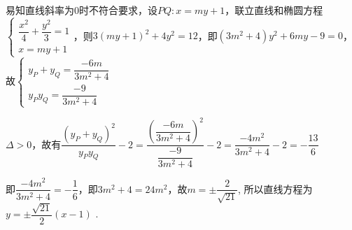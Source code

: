 \begin{enumerate}
\begin{jieda}
\begin{enumerate}
            易知直线斜率为0时不符合要求，设$PQ: x = my + 1$，联立直线和椭圆方程$\left\{\begin{array}{l}
                    \dfrac{{x}^{2}}{4} + \dfrac{{y}^{2}}{3} = 1  \\
                    x = my + 1
            \end{array}\right.$，则$3(my + 1)^2 + 4y^2 = 12$，即$(3m^2+4)y^2+6my-9=0$，故$\left\{\begin{array}{l}
                    y_P+y_Q = \dfrac{-6m}{3m^2+4} \\
                    y_Py_Q = \dfrac{-9}{3m^2+4}
            \end{array}\right.$

            $\Delta > 0$，故有$\dfrac{(y_P+y_Q)^2}{y_Py_Q} - 2 = \dfrac{\left(\dfrac{-6m}{3m^2+4}\right)^2}{\dfrac{-9}{3m^2+4}} - 2 = \dfrac{-4m^2}{3m^2+4} - 2 = -\dfrac{13}{6}$

            即$\dfrac{-4m^2}{3m^2+4} = -\dfrac{1}{6}$，即$3m^2+4 = 24m^2$，故$m = \pm \dfrac{2}{\sqrt{21}}$, 所以直线方程为 $y =  \pm  \dfrac{\sqrt{21}}{2}\left( {x - 1}\right)$ .
        \end{enumerate}
    \end{jieda}
\end{enumerate}
